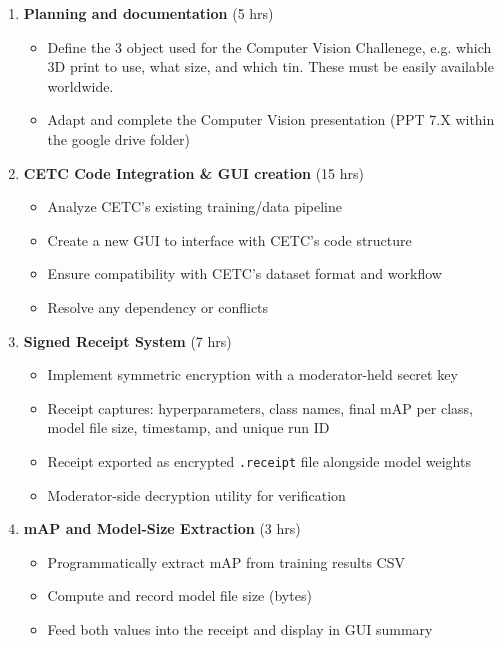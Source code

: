 \documentclass[a4]{article}
\begin{document}
\begin{enumerate}[leftmargin=*]
    \item \textbf{Planning and documentation} (5 hrs)
    \begin{itemize}
        \item Define the 3 object used for the Computer Vision Challenege, e.g. which 3D print to use, what size, and which tin. These must be easily available worldwide.
        \item Adapt and complete the Computer Vision presentation (PPT 7.X within the google drive folder)
    \end{itemize}
    \item \textbf{CETC Code Integration \& GUI creation} (15 hrs)
    \begin{itemize}
        \item Analyze CETC's existing training/data pipeline
        \item Create a new GUI to interface with CETC's code structure
        \item Ensure compatibility with CETC's dataset format and workflow
        \item Resolve any dependency or conflicts
    \end{itemize}

    \item \textbf{Signed Receipt System} (7 hrs)
    \begin{itemize}
        \item Implement symmetric encryption with a moderator-held secret key
        \item Receipt captures: hyperparameters, class names, final mAP per class, model file size, timestamp, and unique run ID
        \item Receipt exported as encrypted \texttt{.receipt} file alongside model weights
        \item Moderator-side decryption utility for verification
    \end{itemize}

    \item \textbf{mAP and Model-Size Extraction} (3 hrs)
    \begin{itemize}
        \item Programmatically extract mAP from training results CSV
        \item Compute and record model file size (bytes)
        \item Feed both values into the receipt and display in GUI summary
    \end{itemize}


\end{enumerate}
\end{document}
